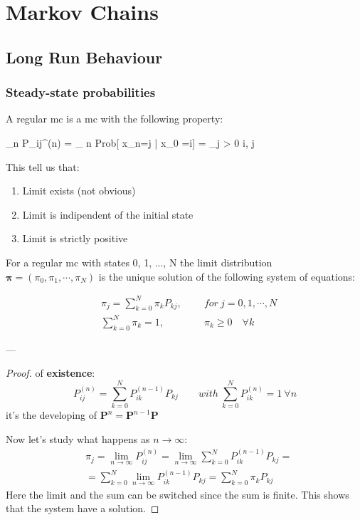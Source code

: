 \chapter{Markov Chains}

\section{Long Run Behaviour}

\subsection{Steady-state probabilities}

	\begin{definition}
		A regular \gls{mc} is a \gls{mc} with the following property:

		\beq \lim_{n \to \infty} P_{ij}^{(n)} = \lim_{ n \to \infty} Prob[ x_n=j | x_0 =i] = \pi_j > 0 \quad \forall i, j \eeq
	\end{definition}

	This tell us that:
	\begin{enumerate}
		\item Limit exists (not obvious)
		\item Limit is indipendent of the initial state
		\item Limit is strictly positive
	\end{enumerate}

	\begin{theorem}
		For a regular \gls{mc} with states 0, 1, ..., N the limit distribution $\bm\pi = (\pi_0,\pi_1,\cdots,\pi_N)$ is the unique solution of the following system of equations:

		\begin{align}
			&\pi_j = \sum_{k=0}^N \pi_k P_{k j} , \qquad ~for ~j = 0,1, \cdots, N \\
			&\sum_{k=0}^N \pi_k = 1, \qquad \qquad \pi_k \ge 0 \quad \forall k
		\end{align}

	\end{theorem}

	---
	\begin{proof} of \textbf{existence}:
		\begin{equation}
  			P_{i j}^{(n)} = \sum_{k=0}^N P_{ik}^{(n-1)} P_{k j}
			\qquad with ~\sum_{k=0}^N P_{ik}^{(n)} = 1 ~\forall n
		\end{equation}
		it's the developing of $\bm P^n = \bm P^{n-1} \bm P$

		Now let's study what happens as $ n \to \infty $:
		\begin{equation}
			\begin{split}
				&\pi_j = \lim_{n \to \infty} P_{ij}^{(n)} = \lim_{n \to \infty} \sum_{k=0}^N P_{ik}^{(n-1)} P_{k j
				} =\\
				&= \sum_{k=0}^N \lim_{n \to \infty} P_{ik}^{(n-1)} P_{k j
				} = \sum_{k=0}^N \pi_k P_{kj}
			\end{split}
		\end{equation}
		Here the limit and the sum can be switched since the sum is finite.
		This shows that the system have a solution.
	\end{proof}

